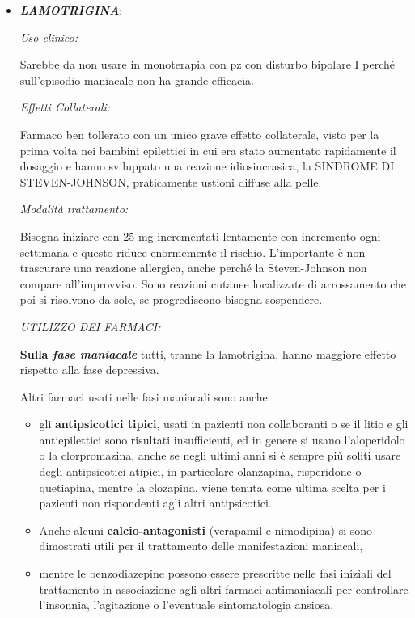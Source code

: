 \begin{itemize}
\item
  \textbf{\emph{LAMOTRIGINA}}:

\emph{\emph{Uso clinico:}}

Sarebbe da non usare in monoterapia con pz con disturbo bipolare I
perché sull'episodio maniacale non ha grande efficacia.

\emph{\emph{Effetti Collaterali: }}

Farmaco ben tollerato con un unico grave effetto collaterale, visto per
la prima volta nei bambini epilettici in cui era stato aumentato
rapidamente il dosaggio e hanno sviluppato una reazione idiosincrasica,
la SINDROME DI STEVEN-JOHNSON, praticamente ustioni diffuse alla pelle.

\emph{\emph{Modalità trattamento:}}

Bisogna iniziare con 25 mg incrementati lentamente con incremento ogni
settimana e questo riduce enormemente il rischio. L'importante è non
trascurare una reazione allergica, anche perché la Steven-Johnson non
compare all'improvviso. Sono reazioni cutanee localizzate di
arrossamento che poi si risolvono da sole, se progrediscono bisogna
sospendere.

\emph{UTILIZZO DEI FARMACI:}

\textbf{Sulla \emph{fase maniacale}} tutti, tranne la lamotrigina, hanno
maggiore effetto rispetto alla fase depressiva.

Altri farmaci usati nelle fasi maniacali sono anche:

\begin{itemize}
\item
  gli \textbf{antipsicotici tipici}, usati in pazienti non collaboranti
  o se il litio e gli antiepilettici sono risultati insufficienti, ed in
  genere si usano l'aloperidolo o la clorpromazina, anche se negli
  ultimi anni si è sempre più soliti usare degli antipsicotici atipici,
  in particolare olanzapina, risperidone o quetiapina, mentre la
  clozapina, viene tenuta come ultima scelta per i pazienti non
  rispondenti agli altri antipsicotici.
\item
  Anche alcuni \textbf{calcio-antagonisti} (verapamil e nimodipina) si
  sono dimostrati utili per il trattamento delle manifestazioni
  maniacali,
\item
  mentre le benzodiazepine possono essere prescritte nelle fasi iniziali
  del trattamento in associazione agli altri farmaci antimaniacali per
  controllare l'insonnia, l'agitazione o l'eventuale sintomatologia
  ansiosa.
\end{itemize}


\end{itemize}

